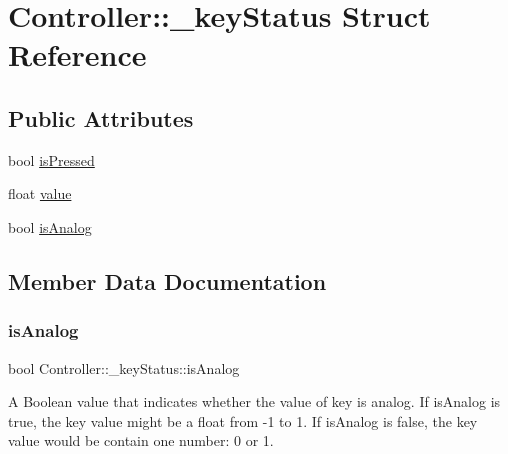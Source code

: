\hypertarget{structController_1_1__keyStatus}{}\section{Controller\+:\+:\+\_\+key\+Status Struct Reference}
\label{structController_1_1__keyStatus}
\subsection*{Public Attributes}
\begin{DoxyCompactItemize}
\item 
bool \hyperlink{structController_1_1__keyStatus_a151e4bba01318304be4d87dce2a64ee6}{is\+Pressed}
\item 
float \hyperlink{structController_1_1__keyStatus_aeb73cddb2cdf68bbee943c8678b2ddb7}{value}
\item 
bool \hyperlink{structController_1_1__keyStatus_a4e9261093859c4819567b67f9687acc4}{is\+Analog}
\end{DoxyCompactItemize}


\subsection{Member Data Documentation}
\mbox{\label{structController_1_1__keyStatus_a4e9261093859c4819567b67f9687acc4}} 
\subsubsection{\texorpdfstring{is\+Analog}{isAnalog}}
{\footnotesize\ttfamily bool Controller\+::\+\_\+key\+Status\+::is\+Analog}

A Boolean value that indicates whether the value of key is analog. If is\+Analog is true, the key value might be a float from -\/1 to 1. If is\+Analog is false, the key value would be contain one number\+: 0 or 1. \mbox{\label{structController_1_1__keyStatus_a151e4bba01318304be4d87dce2a64ee6}} 
